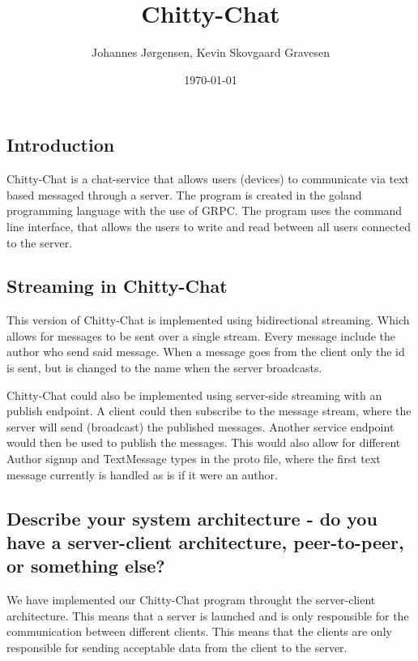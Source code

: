 \documentclass[a4paper,11pt]{article}
\title{Chitty-Chat}
\author{Johannes Jørgensen, Kevin Skovgaard Gravesen}
\date{\today}
\begin{document}
 

\maketitle

\subsection*{Introduction}
Chitty-Chat is a chat-service that allows users (devices) to communicate via text based messaged through a server. The program is created in the goland programming language with the use of GRPC.
The program uses the command line interface, that allows the users to write and read between all users connected to the server.

\subsection*{Streaming in Chitty-Chat}
This version of Chitty-Chat is implemented using bidirectional streaming. Which allows for messages to be sent over a single stream.
Every message include the author who send said message. When a message goes from the client only the id is sent, but is changed to the name when the server broadcasts.

Chitty-Chat could also be implemented using server-side streaming with an publish endpoint.
A client could then subscribe to the message stream, where the server will send (broadcast) the published messages.
Another service endpoint would then be used to publish the messages.
This would also allow for different Author signup and TextMessage types in the proto file, where the first text message currently is handled as is if it were an author.

\subsection*{Describe your system architecture - do you have a server-client architecture, peer-to-peer, or something else?}
We have implemented our Chitty-Chat program throught the server-client architecture. 
This means that a server is launched and is only responsible for the communication between different clients. This means that the clients are only responsible for
sending acceptable data from the client to the server.
\end{document}
